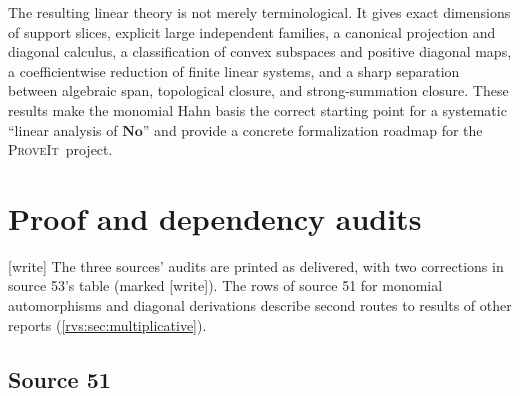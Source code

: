 \documentclass[11pt,letterpaper]{article}
\numberwithin{equation}{section}
\theoremstyle{definition}
\theoremstyle{remark}
\newcommand{\No}{\mathbf{No}}
\newcommand{\repo}{\textsc{ProveIt}}
\newcommand{\wtag}{\textup{[write]}}%
\begin{document}
The resulting linear theory is not merely terminological. It gives exact dimensions
of support slices, explicit large independent families, a canonical projection and
diagonal calculus, a classification of convex subspaces and positive diagonal maps,
a coefficientwise reduction of finite linear systems, and a sharp separation
between algebraic span, topological closure, and strong-summation closure. These
results make the monomial Hahn basis the correct starting point for a systematic
``linear analysis of $\No$'' and provide a concrete formalization roadmap for the
\repo\ project.

\appendix

\section{Proof and dependency audits}\label{rvs:app:audit}\label{rvs:eu:app:audit}\label{rvs:cv:app:audit}

\wtag{} The three sources' audits are printed as delivered, with two
corrections in source 53's table (marked \wtag{}).  The rows of source 51
for monomial automorphisms and diagonal derivations describe second routes
to results of other reports (\cref{rvs:sec:multiplicative}).

\subsection{Source 51}
\end{document}
